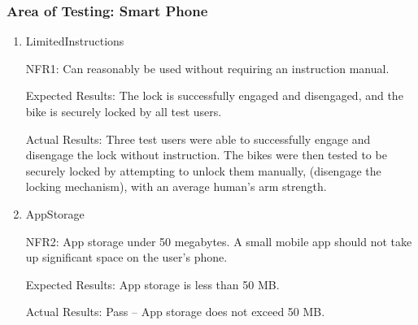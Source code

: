 \documentclass[12pt, titlepage]{article}
\begin{document}
\subsubsection{Area of Testing: Smart Phone}

\begin{enumerate}

\item{LimitedInstructions

NFR1: Can reasonably be used without requiring an instruction manual. }

Expected Results: The lock is successfully engaged and disengaged, and the bike is securely locked by all test users.

Actual Results: Three test users were able to successfully engage and disengage the lock without instruction. The bikes were then tested to be securely locked by attempting to unlock them manually, (disengage the locking mechanism), with an average human's arm strength. 

\item{AppStorage

NFR2: App storage under 50 megabytes. A small mobile app should not take up significant space on the user’s phone.  }

Expected Results: App storage is less than 50 MB. 

Actual Results: Pass -- App storage does not exceed 50 MB. 

\end{enumerate}
\end{document}
